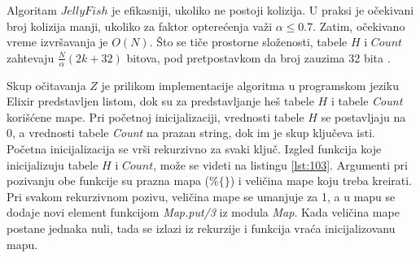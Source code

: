 \documentclass[12pt,oneside]{memoir}
\begin{document}
\begin{comment}

\begin{figure}[!ht]
  \centering
  \texttt{[image: 58\_3algoritma.PNG]}
  \caption{Razmatra se skup 4-mera $Z = \{AC; CG; AC; GT; CA; GG; AC; GT\}$: (a) Ilustruje jednostavan metod za brojanje k-mera koji koristi tabelu \textit{Count} veličine 4k. (b) Ilustruje \textit{JellyFish} metod brojanja k-mera koja koristi heš tabelu veličine 7. Heš funkcija je $h(z) = b(z)$ \textit{mod} $7$. Na primer, $GT$ se čuva u tabeli $Count$ sa indeksom 4, jer je $h(GT) = 4$. U ovom primeru se javlja jedna kolizija. Pošto je i $h(CA) = 4$, $CA$ je u koliziji sa $GT$. Linearnim isprobavanjem $CA$ se ipak čuva u tabeli $Count$ sa indeksom 5. (c) Ilustruje DSK metod brojanja k-mera.
Pretpostavka je da je $h(z) = b(z)$, $n_{list} = 2$ i $n_{sublist} = 2$. DSK deli Z u
4 ($= n_{list} * n_{sublist}$) podliste, a zatim pokreće \textit{JellyFish} algoritam za brojanje k-mera u svakoj podlisti.}
  \label{fig:5}
  \source{\cite{WingKinSung}}
\end{figure}

Slika \ref{fig:5}(b) daje primer koji ilustruje algoritam $JellyFish$. 
\end{comment}

Algoritam $JellyFish$ je efikasniji, ukoliko ne postoji kolizija. U praksi je očekivani broj kolizija manji, ukoliko za faktor opterećenja važi $\alpha \leq 0.7$. Zatim, očekivano vreme izvršavanja je $O(N)$. Što se tiče prostorne složenosti, tabele $H$ i $Count$ zahtevaju $\frac{N}{\alpha}(2k + 32)$ bitova, pod pretpostavkom da broj zauzima 32 bita \cite{WingKinSung}.

Skup očitavanja $Z$ je prilikom implementacije algoritma u programskom jeziku Elixir predstavljen listom, dok su za predstavljanje heš tabele $H$ i tabele \textit{Count} korišćene mape. Pri početnoj inicijalizaciji, vrednosti tabele $H$ se postavljaju na 0, a vrednosti tabele \textit{Count} na prazan string, dok im je skup ključeva isti. Početna inicijalizacija se vrši rekurzivno za svaki ključ. Izgled funkcija koje inicijalizuju tabele $H$ i $Count$, može se videti na listingu \ref{lst:103}. Argumenti pri pozivanju obe funkcije su prazna mapa ($\%\{\}$) i veličina mape koju treba kreirati. Pri svakom rekurzivnom pozivu, veličina mape se umanjuje za 1, a u mapu se dodaje novi element funkcijom \textit{Map.put/3} iz modula \textit{Map}. Kada veličina mape postane jednaka nuli, tada se izlazi iz rekurzije i funkcija vraća inicijalizovanu mapu. 
\end{document}
